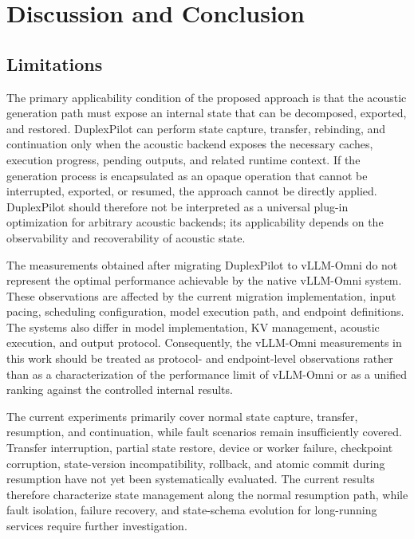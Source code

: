 \documentclass{article}
\begin{document}
\section{Discussion and Conclusion}
\label{sec:discussion_conclusion}

\subsection{Limitations}
\label{sec:limitations}

The primary applicability condition of the proposed approach is that the
acoustic generation path must expose an internal state that can be
decomposed, exported, and restored. DuplexPilot can perform state
capture, transfer, rebinding, and continuation only when the acoustic
backend exposes the necessary caches, execution progress, pending
outputs, and related runtime context. If the generation process is
encapsulated as an opaque operation that cannot be interrupted, exported,
or resumed, the approach cannot be directly applied. DuplexPilot should
therefore not be interpreted as a universal plug-in optimization for
arbitrary acoustic backends; its applicability depends on the
observability and recoverability of acoustic state.

The measurements obtained after migrating DuplexPilot to vLLM-Omni do
not represent the optimal performance achievable by the native
vLLM-Omni system. These observations are affected by the current
migration implementation, input pacing, scheduling configuration, model
execution path, and endpoint definitions. The systems also differ in
model implementation, KV management, acoustic execution, and output
protocol. Consequently, the vLLM-Omni measurements in this work should
be treated as protocol- and endpoint-level observations rather than as a
characterization of the performance limit of vLLM-Omni or as a unified
ranking against the controlled internal results.

The current experiments primarily cover normal state capture, transfer,
resumption, and continuation, while fault scenarios remain
insufficiently covered. Transfer interruption, partial state restore,
device or worker failure, checkpoint corruption, state-version
incompatibility, rollback, and atomic commit during resumption have not
yet been systematically evaluated. The current results therefore
characterize state management along the normal resumption path, while
fault isolation, failure recovery, and state-schema evolution for
long-running services require further investigation.
\end{document}
